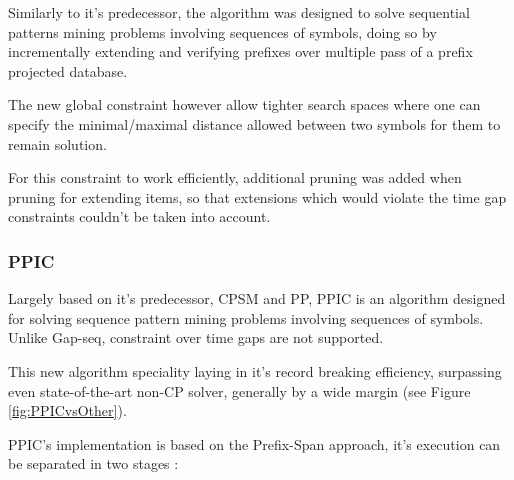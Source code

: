 \documentclass{eplmastersthesis}
\begin{document}
Similarly to it's predecessor, the algorithm was designed to solve sequential patterns mining problems involving sequences of symbols, doing so by incrementally extending and verifying prefixes over multiple pass of a prefix projected database. \newline

The new global constraint however allow tighter search spaces where one can specify the minimal/maximal distance allowed between two symbols for them to remain solution. \newline

For this constraint to work efficiently, additional pruning was added when pruning for extending items, so that extensions which would violate the time gap constraints couldn't be taken into account.

\subsubsection{PPIC}

Largely based on it's predecessor, CPSM and PP, PPIC is an algorithm designed for solving sequence pattern mining problems involving sequences of symbols. Unlike Gap-seq, constraint over time gaps are not supported. \newline

This new algorithm speciality laying in it's record breaking efficiency, surpassing even state-of-the-art non-CP solver, generally by a wide margin (see Figure \ref{fig:PPICvsOther}).

PPIC's implementation is based on the Prefix-Span approach, it's execution can be separated in two stages :
\end{document}
